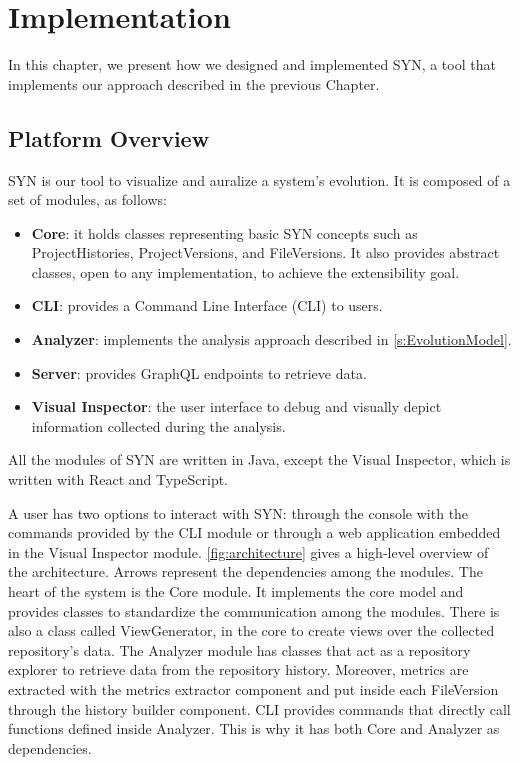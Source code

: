 
\chapter[Implementation]{Implementation}
\graphicspath{ {images/implementation} }
In this chapter, we present how we designed and implemented SYN, a tool that implements our approach described in the previous Chapter.

\section{Platform Overview}
SYN is our tool to visualize and auralize a system's evolution. 
It is composed of a set of modules, as follows:
\begin{itemize}
    \item \textbf{Core}: it holds classes representing basic SYN concepts such as ProjectHistories, ProjectVersions, and FileVersions. It also provides abstract classes, open to any implementation, to achieve the extensibility goal.
    \item \textbf{CLI}: provides a Command Line Interface (CLI) to users.
    \item \textbf{Analyzer}: implements the analysis approach described in \autoref{s:EvolutionModel}. 
    \item \textbf{Server}: provides GraphQL endpoints to retrieve data. 
    \item \textbf{Visual Inspector}: the user interface to debug and visually depict information collected during the analysis. 
\end{itemize}

All the modules of SYN are written in Java, except the Visual Inspector, which is written with React and TypeScript. 

A user has two options to interact with SYN: through the console with the commands provided by the CLI module 
or through a web application embedded in the Visual Inspector module.
\autoref{fig:architecture} gives a high-level overview of the architecture. Arrows represent the dependencies among the modules.
The heart of the system is the Core module. It implements the core model and provides classes to standardize the communication among the modules.
There is also a class called ViewGenerator, in the core to create views over the collected repository's data.
The Analyzer module has classes that act as a repository explorer to retrieve data from the repository history. 
Moreover, metrics are extracted with the metrics extractor component and put inside each FileVersion through the history builder component. 
CLI provides commands that directly call functions defined inside Analyzer. 
This is why it has both Core and Analyzer as dependencies. 

